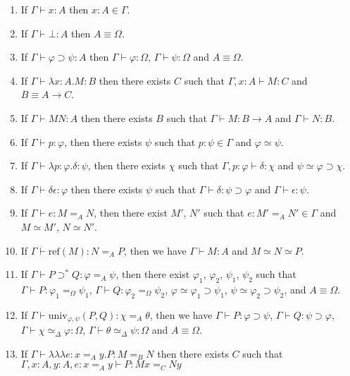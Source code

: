 \documentclass[a4paper,UKenglish]{lipics-v2016}
\newcommand*{\reff}[1]{\ensuremath{\mathrm{ref} \left( {#1} \right)}}
\newcommand*{\univ}[4]{\ensuremath{\mathrm{univ}_{{#1}, {#2}} \left({#3} , {#4} \right)}}
\newcommand*{\triplelambda}{\ensuremath{\lambda \!\! \lambda \!\! \lambda}}
\theoremstyle{plain}
\theoremstyle{definition}
\begin{document}
\begin{lemma}[Generation]
$ $
\begin{enumerate}
\item
If $\Gamma \vdash x : A$ then $x : A \in \Gamma$.
\item
If $\Gamma \vdash \bot : A$ then $A \equiv \Omega$.
\item
If $\Gamma \vdash \varphi \supset \psi : A$ then $\Gamma \vdash \varphi : \Omega$, $\Gamma \vdash \psi : \Omega$ and $A \equiv \Omega$.
\item
If $\Gamma \vdash \lambda x:A.M : B$ then there exists $C$ such that $\Gamma, x : A \vdash M : C$ and $B \equiv A \rightarrow C$.
\item
If $\Gamma \vdash MN : A$ then there exists $B$ such that $\Gamma \vdash M : B \rightarrow A$ and $\Gamma \vdash N : B$.
\item
If $\Gamma \vdash p : \varphi$, then there exists $\psi$ such that $p : \psi \in \Gamma$ and $\varphi \simeq \psi$.
\item
If $\Gamma \vdash \lambda p:\varphi.\delta : \psi$, then there exists $\chi$ such that $\Gamma, p : \varphi \vdash \delta : \chi$ and $\psi \simeq \varphi \supset \chi$.
\item
If $\Gamma \vdash \delta \epsilon : \varphi$ then there exists $\psi$ such that $\Gamma \vdash \delta : \psi \supset \varphi$ and $\Gamma \vdash \epsilon : \psi$.
\item
If $\Gamma \vdash e : M =_A N$, then there exist $M'$, $N'$ such that $e : M' =_A N' \in \Gamma$ and $M \simeq M'$, $N \simeq N'$.
\item
If $\Gamma \vdash \reff{M} : N =_A P$, then we have $\Gamma \vdash M : A$ and $M \simeq N \simeq P$.
\item
If $\Gamma \vdash P \supset^* Q : \varphi =_A \psi$, then there exist $\varphi_1$, $\varphi_2$, $\psi_1$, $\psi_2$ such that
$\Gamma \vdash P : \varphi_1 =_\Omega \psi_1$, $\Gamma \vdash Q : \varphi_2 =_\Omega \psi_2$, $\varphi \simeq \varphi_1 \supset \psi_1$, $\psi \simeq \varphi_2 \supset \psi_2$, and $A \equiv \Omega$.
\item
If $\Gamma \vdash \univ{\varphi}{\psi}{P}{Q} : \chi =_A \theta$, then we have $\Gamma \vdash P : \varphi \supset \psi$, $\Gamma \vdash Q : \psi \supset \varphi$,
$\Gamma \vdash \chi \simeq_\Delta \varphi : \Omega$, $\Gamma \vdash \theta \simeq_\Delta \psi : \Omega$ and $A \equiv \Omega$.
\item
If $\Gamma \vdash \triplelambda e : x =_A y. P : M =_B N$ then there exists $C$ such that $\Gamma, x : A, y : A, e : x =_A y \vdash P : M x =_C N y$

\end{enumerate}
\end{lemma}
\end{document}
